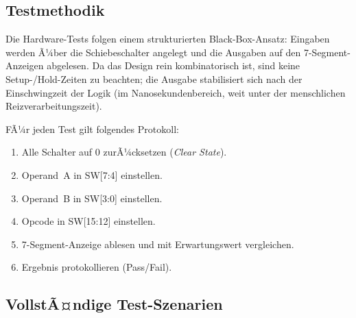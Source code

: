 ﻿\documentclass[12pt,a4paper]{report}
\begin{document}
\subsection{Testmethodik}
\label{subsec:testmethodik}

Die Hardware-Tests folgen einem strukturierten Black-Box-Ansatz: Eingaben werden Ã¼ber die Schiebeschalter angelegt und die Ausgaben auf den 7-Segment-Anzeigen abgelesen. Da das Design rein kombinatorisch ist, sind keine Setup-/Hold-Zeiten zu beachten; die Ausgabe stabilisiert sich nach der Einschwingzeit der Logik (im Nanosekundenbereich, weit unter der menschlichen Reizverarbeitungszeit).

FÃ¼r jeden Test gilt folgendes Protokoll:
\begin{enumerate}
  \item Alle Schalter auf 0 zurÃ¼cksetzen (\textit{Clear State}).
  \item Operand~A in SW[7:4] einstellen.
  \item Operand~B in SW[3:0] einstellen.
  \item Opcode in SW[15:12] einstellen.
  \item 7-Segment-Anzeige ablesen und mit Erwartungswert vergleichen.
  \item Ergebnis protokollieren (Pass/Fail).
\end{enumerate}

\subsection{VollstÃ¤ndige Test-Szenarien}
\label{subsec:test_szenarien}
\end{document}
